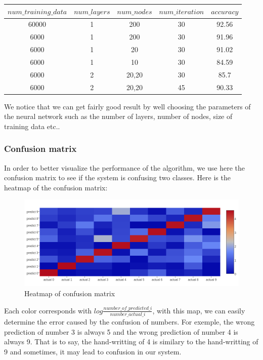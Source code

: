 \documentclass[paper=a4, french, 11pt]{scrartcl}
\begin{document}
\begin{small}
	\begin{tabular}{ |c|c|c|c|c| }
	\hline
	$num\_training\_data$ & $num\_layers$ & $num\_nodes$ & $num\_iteration$ & $accuracy$ \\
	\hline
	60000 & 1 & 200  & 30 & 92.56 \\
	\hline
	6000 & 1 & 200  & 30 & 91.96 \\
	\hline
	6000 & 1 & 20  & 30 & 91.02 \\
	\hline
	6000	 & 1 & 10  & 30 & 84.59 \\
	\hline
	6000 & 2 & 20,20  & 30 & 85.7\\
	\hline
	6000 & 2 & 20,20  & 45 & 90.33\\
	\hline
	\end{tabular}
\end{small}

We notice that we can get fairly good result by well choosing the parameters of the neural network such as the number of layers, number of nodes, size of training data etc.. 

\subsubsection{Confusion matrix}
In order to better visualize the performance of the algorithm, we use here the confusion matrix to see if the system is confusing two classes. Here is the heatmap of the confusion matrix:

\begin{figure}[h]
\vspace{-1ex}
\begin{center}
   \includegraphics[width=1.0\linewidth]{heatmap_log.png}
\end{center}
\vspace{-3ex}
\caption{Heatmap of confusion matrix}
\label{fig:heatmap}
\end{figure}

Each color corresponds with $log\frac{number\_of\_predicted\_i}{number\_actual\_ i}$, with this map, we can easily determine the error caused by the confusion of numbers. For exemple, the wrong prediction of number 3 is always 5 and the wrong prediction of number 4 is always 9. That is to say, the hand-writting of 4 is similary to the hand-writting of 9 and sometimes, it may lead to confusion in our system.
\end{document}
